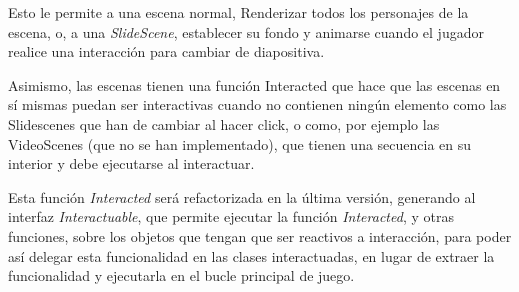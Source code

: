 Esto le permite a una escena normal, Renderizar todos los personajes de la escena, o, a una \textit{SlideScene}, establecer su fondo y animarse cuando el jugador realice una interacción para cambiar de diapositiva.

Asimismo, las escenas tienen una función Interacted que hace que las escenas en sí mismas puedan ser interactivas cuando no contienen ningún elemento como las Slidescenes que han de cambiar al hacer click, o como, por ejemplo las VideoScenes (que no se han implementado), que tienen una secuencia en su interior y debe ejecutarse al interactuar.

Esta función \textit{Interacted} será refactorizada en la última versión, generando al interfaz \textit{Interactuable}, que permite ejecutar la función \textit{Interacted}, y otras funciones, sobre los objetos que tengan que ser reactivos a interacción, para poder así delegar esta funcionalidad en las clases interactuadas, en lugar de extraer la funcionalidad y ejecutarla en el bucle principal de juego.